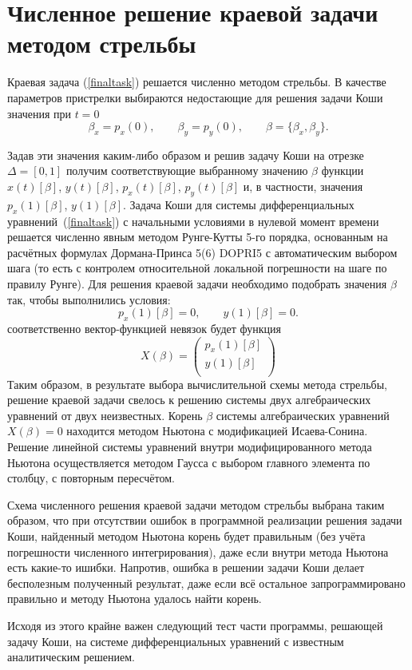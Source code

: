 \section{Численное решение краевой задачи методом стрельбы}
Краевая задача (\ref{finaltask}) решается численно методом стрельбы. В качестве параметров пристрелки выбираются недостающие для решения задачи Коши значения при $t = 0$
\[
\beta_x = p_x(0), \qquad \beta_y = p_y(0), \qquad \beta =\{ \beta_x, \beta_y \}.
\] 

Задав эти значения каким-либо образом и решив задачу Коши на отрезке $\Delta = [0,1]$ получим соответствующие выбранному значению $\beta$ функции $x(t)[\beta]$, $y(t)[\beta]$, $p_x(t)[\beta]$, $p_y(t)[\beta]$ и, в частности, значения $p_x(1)[\beta]$, $y(1)[\beta]$. Задача Коши для системы дифференциальных уравнений~(\ref{finaltask}) с начальными условиями в нулевой момент времени решается численно явным методом Рунге-Кутты 5-го порядка, основанным на расчётных формулах Дормана-Принса 5(6) DOPRI5 с автоматическим выбором шага (то есть с контролем относительной локальной погрешности на шаге по правилу Рунге). Для решения краевой задачи необходимо подобрать значения $\beta$ так, чтобы выполнились условия:
\[
p_x(1)[\beta] = 0,\qquad y(1)[\beta] = 0.
\]
соответственно вектор-функцией невязок будет функция 
\[
X(\beta) = 
\begin{pmatrix}
p_x(1)[\beta]  \\
y(1)[\beta] \\
\end{pmatrix}
\] 
Таким образом, в результате выбора вычислительной схемы метода стрельбы, решение краевой задачи свелось к решению системы двух алгебраических уравнений от двух неизвестных. Корень $\beta$ системы алгебраических уравнений $X(\beta) = 0$ находится методом Ньютона с модификацией Исаева-Сонина. Решение линейной системы уравнений внутри модифицированного метода Ньютона осуществляется методом Гаусса с выбором главного элемента по столбцу, с повторным пересчётом.

Схема численного решения краевой задачи методом стрельбы выбрана таким образом, что при отсутствии ошибок в программной реализации решения задачи Коши, найденный методом Ньютона корень будет правильным (без учёта погрешности численного интегрирования), даже если внутри метода Ньютона есть какие-то ишибки. Напротив, ошибка в решении задачи Коши делает бесполезным полученный результат, даже если всё остальное запрограммировано правильно и методу Ньютона удалось найти корень.

Исходя из этого крайне важен следующий тест части программы, решающей задачу Коши, на системе дифференциальных уравнений с известным аналитическим решением.
